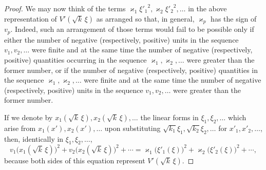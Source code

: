 \documentclass[b5paper,twoside]{article}
\begin{document}
\begin{proof}
We may now think of the terms
$\varkappa_1{\xi'_1}^{2},\varkappa_2{\xi'_2}^{2},\ldots$ in the above
representation of $V'(\sqrt{k}\,\xi)$ as arranged so that, in general,
$\varkappa_p$ has the sign of $v_p$. Indeed, such an arrangement of those
terms would fail to be possible only if either the number of negative
(respectively, positive) units in the sequence $v_1,v_2,\ldots$ were finite
and at the same time the number of negative (respectively, positive)
quantities occurring in the sequence
$\varkappa_1,\varkappa_2,\ldots$ were greater than the former number, or if
the number of negative (respectively, positive) quantities in the sequence
$\varkappa_1,\varkappa_2,\ldots$ were finite and at the same time the number
of negative (respectively, positive) units in the sequence
$v_1,v_2,\ldots$ were greater than the former number.

If we denote by
$x_1(\sqrt{k}\,\xi),x_2(\sqrt{k}\,\xi),\ldots$ the linear forms in
$\xi_1,\xi_2,\ldots$ which arise from $x_1(x'),x_2(x'),\ldots$ upon
substituting $\sqrt{k_1}\xi_1,\sqrt{k_2}\xi_2,\ldots$ for
$x'_1,x'_2,\ldots$, then, identically in $\xi_1,\xi_2,\ldots$,
\[
  v_1\bigl(x_1(\sqrt{k}\,\xi)\bigr)^2
  +v_2\bigl(x_2(\sqrt{k}\,\xi)\bigr)^2+\cdots
  =\varkappa_1\bigl(\xi'_1(\xi)\bigr)^2
  +\varkappa_2\bigl(\xi'_2(\xi)\bigr)^2+\cdots,
\]
because both sides of this equation represent $V'(\sqrt{k}\,\xi)$.


\end{proof}
\end{document}
